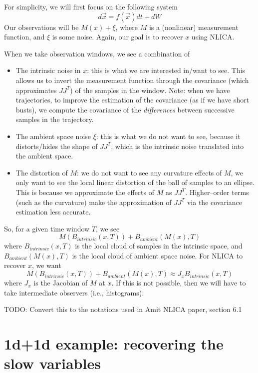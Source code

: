 \documentclass[12pt]{article}
\begin{document}
For simplicity, we will first focus on the following system
\begin{equation} \label{eq:NIV_model}
d\vec{x} = f(\vec{x}) dt + dW
\end{equation}
%
Our observations will be $M(x) + \xi$, where $M$ is a (nonlinear) measurement function, and $\xi$ is some noise.
%
Again, our goal is to recover $x$ using NLICA.

When we take observation windows, we see a combination of 
\begin{itemize}
\item The intrinsic noise in $x$: this is what we are interested in/want to see. This allows us to invert the measurement function through the covariance (which approximates $JJ^T$) of the samples in the window. Note: when we have trajectories, to improve the estimation of the covariance (as if we have short busts), we compute the covariance of the {\em differences} between successive samples in the trajectory. 
\item The ambient space noise $\xi$: this is what we do not want to see, because it distorts/hides the shape of $JJ^T$, which is the intrinsic noise translated into the ambient space.
\item The distortion of $M$: we do not want to see any curvature effects of $M$, we only want to see the local linear distortion of the ball of samples to an ellipse. This is because we approximate the effects of $M$ as $JJ^T$. Higher--order terms (such as the curvature) make the approximation of $JJ^T$ via the covariance estimation less accurate.  
\end{itemize}

So, for a given time window $T$, we see
\begin{equation}
M(B_{intrinsic} (x, T)) + B_{ambient} (M(x), T)
\end{equation}
where $B_{intrinsic} (x, T)$ is the local cloud of samples in the intrinsic space, and $B_{ambient} (M(x), T)$ is the local cloud of ambient space noise.
%
For NLICA to recover $x$, we want
\begin{equation}
M(B_{intrinsic} (x, T)) + B_{ambient} (M(x), T) \approx J_{x} B_{intrinsic} (x, T)
\end{equation}
where $J_{x}$ is the Jacobian of $M$ at $x$.
%
If this is not possible, then we will have to take intermediate observers (i.e., histograms).

TODO: Convert this to the notations used in Amit NLICA paper, section 6.1

\section{1d+1d example: recovering the slow variables}
\end{document}
